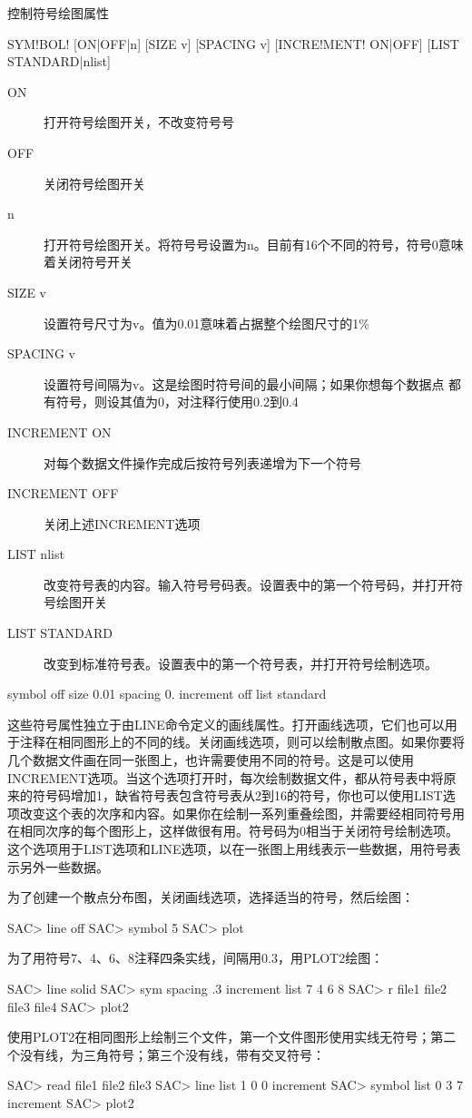 \label{cmd:symbol}

控制符号绘图属性

\begin{SACSTX}
SYM!BOL! [ON|OFF|n] [SIZE v] [SPACING v] [INCRE!MENT! ON|OFF]
    [LIST STANDARD|nlist]
\end{SACSTX}

\begin{description}
\item [ON] 打开符号绘图开关，不改变符号号
\item [OFF] 关闭符号绘图开关
\item [n] 打开符号绘图开关。将符号号设置为n。目前有16个不同的符号，符号0意味着关闭符号开关
\item [SIZE v] 设置符号尺寸为v。值为0.01意味着占据整个绘图尺寸的1\%
\item [SPACING v] 设置符号间隔为v。这是绘图时符号间的最小间隔；如果你想每个数据点
    都有符号，则设其值为0，对注释行使用0.2到0.4
\item [INCREMENT ON] 对每个数据文件操作完成后按符号列表递增为下一个符号
\item [INCREMENT OFF] 关闭上述INCREMENT选项
\item [LIST nlist] 改变符号表的内容。输入符号号码表。设置表中的第一个符号码，并打开符号绘图开关
\item [LIST STANDARD] 改变到标准符号表。设置表中的第一个符号表，并打开符号绘制选项。
\end{description}

\begin{SACDFT}
symbol off size 0.01 spacing 0. increment off list standard
\end{SACDFT}

这些符号属性独立于由LINE命令定义的画线属性。打开画线选项，它们也可以用于注释在相同图形上的不同的线。关闭画线选项，则可以绘制散点图。如果你要将几个数据文件画在同一张图上，也许需要使用不同的符号。这是可以使用INCREMENT选项。当这个选项打开时，每次绘制数据文件，都从符号表中将原来的符号码增加1，缺省符号表包含符号表从2到16的符号，你也可以使用LIST选项改变这个表的次序和内容。如果你在绘制一系列重叠绘图，并需要经相同符号用在相同次序的每个图形上，这样做很有用。符号码为0相当于关闭符号绘制选项。这个选项用于LIST选项和LINE选项，以在一张图上用线表示一些数据，用符号表示另外一些数据。

为了创建一个散点分布图，关闭画线选项，选择适当的符号，然后绘图：
\begin{SACCode}
SAC> line off
SAC> symbol 5
SAC> plot
\end{SACCode}

为了用符号7、4、6、8注释四条实线，间隔用0.3，用PLOT2绘图：
\begin{SACCode}
SAC> line solid
SAC> sym spacing .3 increment list 7 4 6 8
SAC> r file1 file2 file3 file4
SAC> plot2
\end{SACCode}

使用PLOT2在相同图形上绘制三个文件，第一个文件图形使用实线无符号；第二个没有线，为三角符号；第三个没有线，带有交叉符号：
\begin{SACCode}
SAC> read file1 file2 file3
SAC> line list 1 0 0 increment
SAC> symbol list 0 3 7 increment
SAC> plot2
\end{SACCode}
